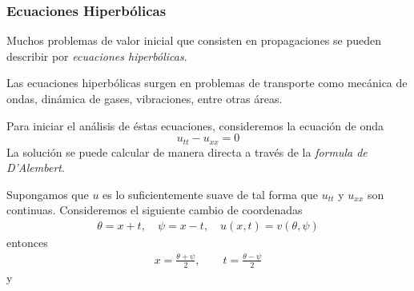 







\subsubsection{Ecuaciones Hiperbólicas}

Muchos problemas de valor inicial que consisten en propagaciones se pueden describir por \textit{ecuaciones hiperbólicas}.

Las ecuaciones hiperbólicas surgen en problemas de transporte como mecánica de ondas, dinámica de gases, vibraciones, entre otras áreas.

Para iniciar el análisis de éstas ecuaciones, consideremos la ecuación de onda
\[
u_{tt} - u_{xx} = 0
\]
La solución se puede calcular de manera directa a través de la \textit{formula de D'Alembert}.

Supongamos que $u$ es lo suficientemente suave de tal forma que $u_{tt}$ y $u_{xx}$ son continuas. Consideremos el siguiente cambio de coordenadas
\begin{align*}
\theta = x + t, \quad \psi = x-t, \quad u(x,t)=v(\theta, \psi)
\end{align*}
entonces
\begin{align*}
x = \frac{\theta + \psi}{2}, \qquad t = \frac{\theta - \psi}{2}
\end{align*}
y



















